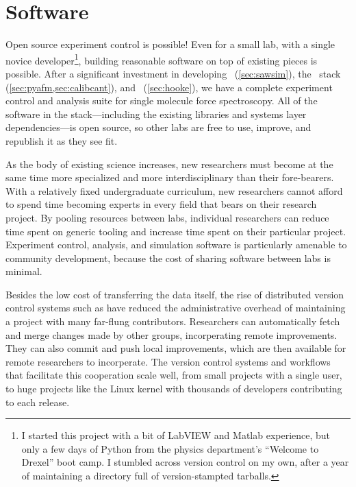 \section{Software}
\label{sec:future:software}

Open source experiment control is possible!  Even for a small lab,
with a single novice developer\footnote{
  I started this project with a bit of LabVIEW and Matlab experience,
  but only a few days of Python from the physics department's
  ``Welcome to Drexel'' boot camp.  I stumbled across version control
  on my own, after a year of maintaining a directory full of
  version-stampted tarballs.
},
building reasonable software on top of existing pieces is possible.
After a significant investment in developing
\sawsim\ (\cref{sec:sawsim}), the \pyafm\ stack
(\cref{sec:pyafm,sec:calibcant}), and \Hooke\ (\cref{sec:hooke}), we
have a complete experiment control and analysis suite for single
molecule force spectroscopy.  All of the software in the
stack---including the existing libraries and systems layer
dependencies---is open source, so other labs are free to use, improve,
and republish it as they see fit.
%

As the body of existing science increases, new researchers must become
at the same time more specialized and more interdisciplinary than
their fore-bearers.  With a relatively fixed undergraduate curriculum,
new researchers cannot afford to spend time becoming experts in every
field that bears on their research project.  By pooling resources
between labs, individual researchers can reduce time spent on generic
tooling and increase time spent on their particular project.
Experiment control, analysis, and simulation software is particularly
amenable to community development, because the cost of sharing
software between labs is minimal.

Besides the low cost of transferring the data itself, the rise of
distributed version control systems such as  have
reduced the administrative overhead of maintaining a project with many
far-flung contributors.  Researchers can automatically fetch and merge
changes made by other groups, incorperating remote improvements.  They
can also commit and push local improvements, which are then available
for remote researchers to incorperate.  The version control systems
and workflows that facilitate this cooperation scale well, from small
projects with a single user, to huge projects like the Linux kernel
with thousands of developers contributing to each release.

